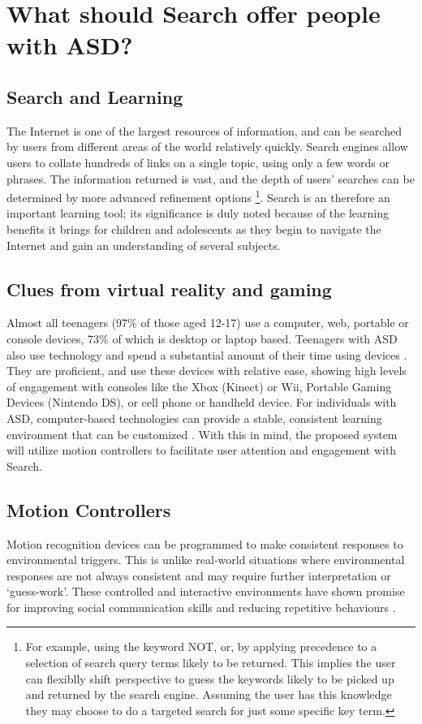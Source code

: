 \documentclass[10pt]{article}
\begin{document}
\section{What should Search offer people with ASD?}\label{What should Search offer people with ASD}
\subsection{Search and Learning}
The Internet is one of the largest resources of information, and can be searched by users from different areas of the world relatively quickly. Search engines allow users to collate hundreds of links on a single topic, using only a few words or phrases. The information returned is vast, and the depth of users’ searches can be determined by more advanced refinement options \footnote{For example, using the keyword NOT, or, by applying precedence to a selection of search query terms likely to be returned. This implies the user can flexiblly shift perspective to guess the keywords likely to be picked up and returned by the search engine. Assuming the user has this knowledge they may choose to do a targeted search for just some specific key term.}. Search is an therefore an important learning tool; its significance is duly noted because of the learning benefits it brings for children and adolescents as they begin to navigate the Internet and gain an understanding of several subjects. 

\subsection{Clues from virtual reality and gaming}
Almost all teenagers (97\% of those aged 12-17) use a computer, web, portable or console devices, 73\% of which is desktop or laptop based. Teenagers with ASD also use technology and spend a substantial amount of their time using devices \cite{Shane and Albert}. They are proficient, and use these devices with relative ease, showing high levels of engagement with consoles like the Xbox (Kinect) or Wii, Portable Gaming Devices (Nintendo DS), or cell phone or handheld device. For individuals with ASD, computer-based technologies can provide a stable, consistent learning environment that can be customized \cite{moore}. With this in mind, the proposed system will utilize motion controllers to facilitate user attention and engagement with Search. 

\subsection{Motion Controllers}
Motion recognition devices can be programmed to make consistent responses to environmental triggers. This is unlike real-world situations where environmental responses are not always consistent and may require further interpretation or ‘guess-work’. These controlled and interactive environments have shown promise for improving social communication skills and reducing repetitive behaviours \cite{gameshealth}.
\end{document}
